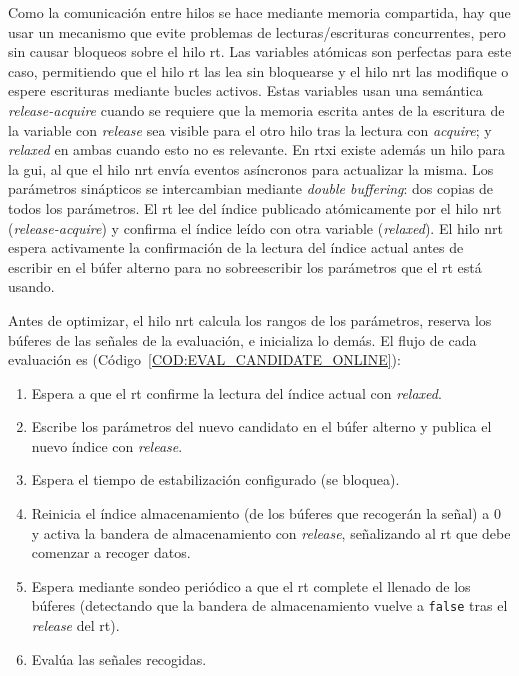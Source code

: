 Como la comunicación entre hilos se hace mediante memoria compartida, hay que usar un mecanismo que evite problemas de lecturas/escrituras concurrentes, pero sin causar bloqueos sobre el hilo \ac{rt}. Las variables atómicas son perfectas para este caso, permitiendo que el hilo \ac{rt} las lea sin bloquearse y el hilo \ac{nrt} las modifique o espere escrituras mediante bucles activos. Estas variables usan una semántica \textit{release-acquire} cuando se requiere que la memoria escrita antes de la escritura de la variable con \textit{release} sea visible para el otro hilo tras la lectura con \textit{acquire}; y \textit{relaxed} en ambas cuando esto no es relevante. En \ac{rtxi} existe además un hilo para la \ac{gui}, al que el hilo \ac{nrt} envía eventos asíncronos para actualizar la misma. Los parámetros sinápticos se intercambian mediante \textit{double buffering}: dos copias de todos los parámetros. El \ac{rt} lee del índice publicado atómicamente por el hilo \ac{nrt} (\textit{release-acquire}) y confirma el índice leído con otra variable (\textit{relaxed}). El hilo \ac{nrt} espera activamente la confirmación de la lectura del índice actual antes de escribir en el búfer alterno para no sobreescribir los parámetros que el \ac{rt} está usando.

Antes de optimizar, el hilo \ac{nrt} calcula los rangos de los parámetros, reserva los búferes de las señales de la evaluación, e inicializa lo demás. El flujo de cada evaluación es (Código~\ref{COD:EVAL_CANDIDATE_ONLINE}):

\begin{enumerate}
    \item Espera a que el \ac{rt} confirme la lectura del índice actual con \textit{relaxed}.
    \item Escribe los parámetros del nuevo candidato en el búfer alterno y publica el nuevo índice con \textit{release}.
    \item Espera el tiempo de estabilización configurado (se bloquea).
    \item Reinicia el índice almacenamiento (de los búferes que recogerán la señal) a 0 y activa la bandera de almacenamiento con \textit{release}, señalizando al \ac{rt} que debe comenzar a recoger datos.
    \item Espera mediante sondeo periódico a que el \ac{rt} complete el llenado de los búferes (detectando que la bandera de almacenamiento vuelve a \texttt{false} tras el \textit{release} del \ac{rt}).
    \item Evalúa las señales recogidas.
\end{enumerate}

